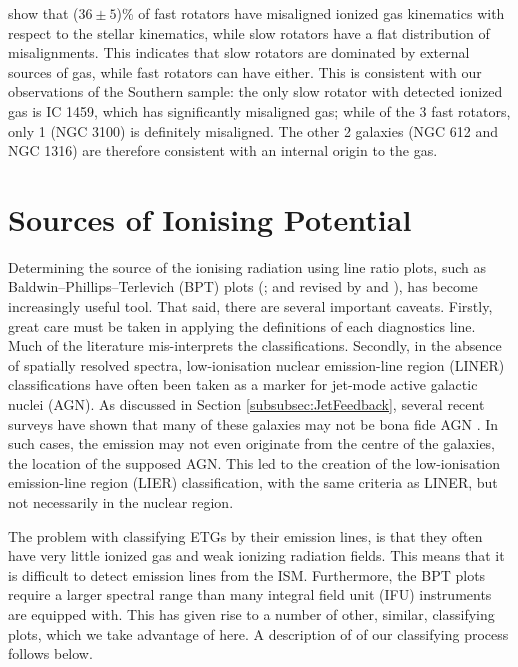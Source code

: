 	\citet{Davis2011a} show that ($36\pm5$)\% of fast rotators have misaligned ionized gas kinematics with respect to the stellar kinematics, while slow rotators have a flat distribution of misalignments. This indicates that slow rotators are dominated by external sources of gas, while fast rotators can have either. This is consistent with our observations of the Southern sample: the only slow rotator with detected ionized gas is IC 1459, which has significantly misaligned gas; while of the 3 fast rotators, only 1 (NGC 3100) is definitely misaligned. The other 2 galaxies (NGC 612 and NGC 1316) are therefore consistent with an internal origin to the gas.



\section{Sources of Ionising Potential}
	\label{sec:Diagnostics}
	Determining the source of the ionising radiation using line ratio plots, such as Baldwin--Phillips--Terlevich (BPT) plots (\citealt{Baldwin1981}; and revised by \citealt{Kewley2001, Kewley2006} and \citealt{Kauffmann2003a}), has become increasingly useful tool. That said, there are several important caveats. Firstly, great care must be taken in applying the definitions of each diagnostics line. Much of the literature mis-interprets the classifications. Secondly, in the absence of spatially resolved spectra, low-ionisation nuclear emission-line region (LINER) classifications have often been taken as a marker for jet-mode active galactic nuclei (AGN). As discussed in Section \ref{subsubsec:JetFeedback}, several recent surveys have shown that many of these galaxies may not be bona fide AGN \citep[e.g.][]{Sarzi2005, Sarzi2010, Singh2013, Belfiore2016a}. In such cases, the emission may not even originate from the centre of the galaxies, the location of the supposed AGN. This led to the creation of the low-ionisation emission-line region (LIER) classification, with the same criteria as LINER, but not necessarily in the nuclear region.

	The problem with classifying ETGs by their emission lines, is that they often have very little ionized gas and weak ionizing radiation fields. This means that it is difficult to detect emission lines from the ISM. Furthermore, the BPT plots require a larger spectral range than many integral field unit (IFU) instruments are equipped with. This has given rise to a number of other, similar, classifying plots, which we take advantage of here. A description of of our classifying process follows below. 

